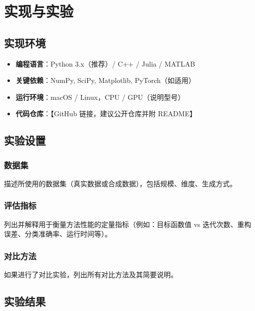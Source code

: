 \section{实现与实验}

\subsection{实现环境}

\begin{itemize}
    \item \textbf{编程语言}：Python 3.x（推荐）/ C++ / Julia / MATLAB
    \item \textbf{关键依赖}：NumPy, SciPy, Matplotlib, PyTorch（如适用）
    \item \textbf{运行环境}：macOS / Linux，CPU / GPU（说明型号）
    \item \textbf{代码仓库}：【GitHub 链接，建议公开仓库并附 README】
\end{itemize}

\subsection{实验设置}

\subsubsection{数据集}

描述所使用的数据集（真实数据或合成数据），包括规模、维度、生成方式。

\subsubsection{评估指标}

列出并解释用于衡量方法性能的定量指标（例如：目标函数值 vs 迭代次数、重构误差、分类准确率、运行时间等）。

\subsubsection{对比方法}

如果进行了对比实验，列出所有对比方法及其简要说明。

\subsection{实验结果}


